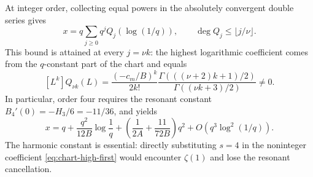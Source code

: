 At integer order, collecting equal powers in the absolutely convergent
double series gives
\begin{equation}\label{eq:chart-integer-degree}
 x=q\sum_{j\ge0}q^jQ_j(\log(1/q)),\qquad
 \deg Q_j\le\lfloor j/\nu\rfloor.
\end{equation}
This bound is attained at every $j=\nu k$: the highest logarithmic
coefficient comes from the $q$-constant part of the chart and equals
\begin{equation}\label{eq:chart-integer-top}
 [L^k]Q_{\nu k}(L)=\frac{(-c_m/B)^k}{2k!}
 \frac{\Gamma(((\nu+2)k+1)/2)}{\Gamma((\nu k+3)/2)}\ne0.
\end{equation}
In particular, order four requires the resonant constant
$B_4'(0)=-H_3/6=-11/36$, and yields
\begin{equation}\label{eq:chart-four}
 x=q+\frac{q^2}{12B}\log\frac1q
 +\left(\frac1{2A}+\frac{11}{72B}\right)q^2
 +O(q^3\log^2(1/q)).
\end{equation}
The harmonic constant is essential: directly substituting $s=4$ in
the noninteger coefficient \eqref{eq:chart-high-first} would encounter
$\zeta(1)$ and lose the resonant cancellation.
